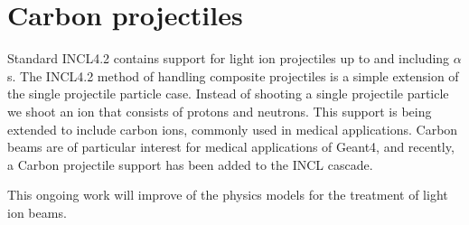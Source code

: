 \documentclass[a4paper]{jpconf}
\begin{document}
\section{Carbon projectiles}\label{sec:carbon}

Standard INCL4.2 contains support for light ion projectiles up to and
including $\alpha$s. The INCL4.2 method of handling composite projectiles
is a simple extension of the single projectile particle case. Instead
of shooting a single projectile particle we shoot an ion that consists
of protons and neutrons.
This support is being extended to include carbon ions, 
commonly used in medical applications.
Carbon beams are of particular interest for medical applications of Geant4, 
and recently, a Carbon projectile support has been added to the INCL cascade. 

This ongoing work will  improve of the physics models for the treatment of light ion beams.





\ack %




\end{document}
